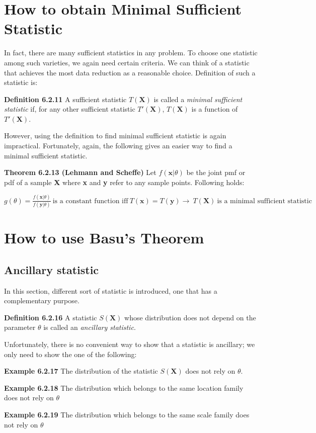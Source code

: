 \documentclass[10pt]{article}
\begin{document}
\section{How to obtain Minimal Sufficient Statistic}
\noindent In fact, there are many sufficient statistics in any problem. To choose one statistic among such varieties, we again need certain criteria. We can think of a statistic that achieves the most data reduction as a reasonable choice. Definition of such a statistic is:\bigskip

\textbf{Definition 6.2.11} A sufficient statistic $T(\textbf{X})$ is called a \textit{minimal sufficient statistic} if, for any other sufficient statistic $T'(\textbf{X})$, $T(\textbf{X})$ is a function of $T'(\textbf{X})$.\bigskip

\noindent However, using the definition to find minimal sufficient statistic is again impractical. Fortunately, again, the following gives an easier way to find a minimal sufficient statistic.\bigskip

\textbf{Theorem 6.2.13 (Lehmann and Scheffe)} Let $f(\textbf{x}|\theta)$ be the joint pmf or pdf of a sample \textbf{X} where \textbf{x} and \textbf{y} refer to any sample points. Following holds:
\begin{center}
    $\displaystyle g(\theta)=\frac{f(\textbf{x}|\theta)}{f(\textbf{y}|\theta)}  \ \textrm{is a constant function iff}\ T(\textbf{x})=T(\textbf{y}) \rightarrow\ T(\textbf{X})\ \textrm{is a minimal sufficient statistic}$
\end{center}

\section{How to use Basu's Theorem}
\subsection{Ancillary statistic}
In this section, different sort of statistic is introduced, one that has a complementary purpose.\bigskip

\textbf{Definition 6.2.16} A statistic $S(\textbf{X})$ whose distribution does not depend on the parameter $\theta$ is called an \textit{ancillary statistic}.\bigskip

\noindent Unfortunately, there is no convenient way to show that a statistic is ancillary; we only need to show the one of the following:
\begin{compactenum}
    \item \textbf{Example 6.2.17} The distribution of the statistic $S(\textbf{X})$ does not rely on $\theta$.
    \item \textbf{Example 6.2.18} The distribution which belongs to the same location family does not rely on $\theta$
    \item \textbf{Example 6.2.19} The distribution which belongs to the same scale family does not rely on $\theta$
\end{compactenum}
\end{document}
